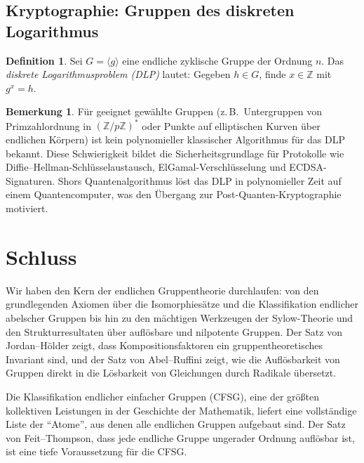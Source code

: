 \documentclass[12pt,a4paper]{amsart}
\theoremstyle{definition}
\newtheorem{definition}[theorem]{Definition}
\newtheorem{remark}[theorem]{Bemerkung}
\begin{document}
\subsection{Kryptographie: Gruppen des diskreten Logarithmus}

\begin{definition}
Sei $G = \langle g \rangle$ eine endliche zyklische Gruppe der Ordnung $n$.
Das \emph{diskrete Logarithmusproblem (DLP)} lautet: Gegeben $h \in G$, finde
$x \in \mathbb{Z}$ mit $g^x = h$.
\end{definition}

\begin{remark}
Für geeignet gewählte Gruppen (z.\,B.\ Untergruppen von Primzahlordnung in
$(\mathbb{Z}/p\mathbb{Z})^*$ oder Punkte auf elliptischen Kurven über endlichen Körpern)
ist kein polynomieller klassischer Algorithmus für das DLP bekannt. Diese Schwierigkeit
bildet die Sicherheitsgrundlage für Protokolle wie Diffie--Hellman-Schlüsselaustausch,
ElGamal-Verschlüsselung und ECDSA-Signaturen. Shors Quantenalgorithmus löst das DLP in
polynomieller Zeit auf einem Quantencomputer, was den Übergang zur Post-Quanten-Kryptographie
motiviert.
\end{remark}

\section{Schluss}
\label{sec:schluss}

Wir haben den Kern der endlichen Gruppentheorie durchlaufen: von den grundlegenden Axiomen
über die Isomorphiesätze und die Klassifikation endlicher abelscher Gruppen bis hin zu den
mächtigen Werkzeugen der Sylow-Theorie und den Strukturresultaten über auflösbare und
nilpotente Gruppen. Der Satz von Jordan--Hölder zeigt, dass Kompositionsfaktoren ein
gruppentheoretisches Invariant sind, und der Satz von Abel--Ruffini zeigt, wie die
Auflösbarkeit von Gruppen direkt in die Lösbarkeit von Gleichungen durch Radikale
übersetzt.

Die Klassifikation endlicher einfacher Gruppen (CFSG), eine der größten kollektiven
Leistungen in der Geschichte der Mathematik, liefert eine vollständige Liste der
``Atome'', aus denen alle endlichen Gruppen aufgebaut sind. Der Satz von Feit--Thompson,
dass jede endliche Gruppe ungerader Ordnung auflösbar ist, ist eine tiefe Voraussetzung
für die CFSG.
\end{document}
